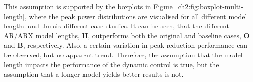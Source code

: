 

This assumption is supported by the boxplots in Figure~\ref{ch2:fig:boxplot-multi-length}, where the peak power distributions are visualised for all different model lengths and the six different case studies.
It can be seen, that the different AR/ARX model lengths, \textbf{II}, outperforms both the original and baseline cases, \textbf{O} and \textbf{B}, respectively.
Also, a certain variation in peak reduction performance can be observed, but no apparent trend.
Therefore, the assumption that the model length impacts the performance of the dynamic control is true, but the assumption that a longer model yields better results is not.



